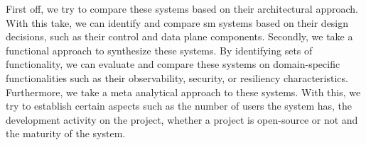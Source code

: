 First off, we try to compare these systems based on their architectural approach. With this take, we can identify and compare \gls{sm} systems based on their design decisions, such as their control and data plane components. Secondly, we take a functional approach to synthesize these systems. By identifying sets of functionality, we can evaluate and compare these systems on domain-specific functionalities such as their observability, security, or resiliency characteristics. Furthermore, we take a meta analytical approach to these systems. With this, we try to establish certain aspects such as the number of users the system has, the development activity on the project, whether a project is open-source or not and the maturity of the system.
